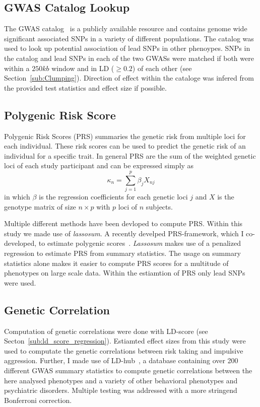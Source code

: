 \subsection{GWAS Catalog Lookup}
\label{sub:GWAS_Cataloge_Lookup}

The GWAS catalog~\cite{Welter2014} is a publicly available resource and contains genome wide significant associated SNPs in a variety of different populations.
The catalog was used to look up potential association of lead SNPs in other phenoypes.
SNPs in the catalog and lead SNPs in each of the two GWASs were matched if both were within a $250kb$ window and in LD ($\ge 0.2$) of each other (see Section~\ref{sub:Clumping}).
Direction of effect within the cataloge was infered from the provided test statistics and effect size if possible.

\subsection{Polygenic Risk Score}
\label{sub:prs}

Polygenic Risk Scores (PRS) summaries the genetic risk from multiple loci for each individual.
These risk scores can be used to predict the genetic risk of an individual for a specific trait.
In general PRS are the sum of the weighted genetic loci of each study participant and can be expressed simply as
\begin{equation}
	\kappa_n = \sum^p_{j=1} \beta_j X_{nj}
\end{equation}
in which $\beta$ is the regression coefficients for each genetic loci $j$ and $X$ is the genotype matrix of size  $n\times p$ with $p$ loci of $n$ subjects.

Multiple different methods have been devloped to compute PRS\@.
Within this study we made use of \textit{lassosum}.
A recently develped PRS-framework, which I co-developed, to estimate polygenic scores~\cite{Mak2016}.
\textit{Lassosum} makes use of a penalized regression to estimate PRS from summary statistics.
The usage on summary statistics alone makes it easier to compute PRS scores for a multitude of phenotypes on large scale data.
Within the estiamtion of PRS only lead SNPs were used.

\subsection{Genetic Correlation}
\label{sub:genetic_correlation}

Computation of genetic correlations were done with LD-score (see Secton~\ref{sub:ld_score_regression}).
Estiamted effect sizes from this study were used to computate the genetic correlations between risk taking and impulsive aggression.
Further, I made use of LD-hub~\cite{ZHENG2016}, a database containing over 200 different GWAS summary statistics to compute genetic correlations between the here analysed phenotypes and a variety of other behavioral phenotypes and psychiatric disorders.
Multiple testing was addressed with a more stringend Bonferroni correction.

